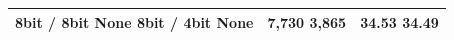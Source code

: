 \begin{tabular}{lll}
\toprule
8bit / 8bit None 8bit / 4bit None & 7,730 3,865 & 34.53 34.49 \\
\midrule
\bottomrule
\end{tabular}
